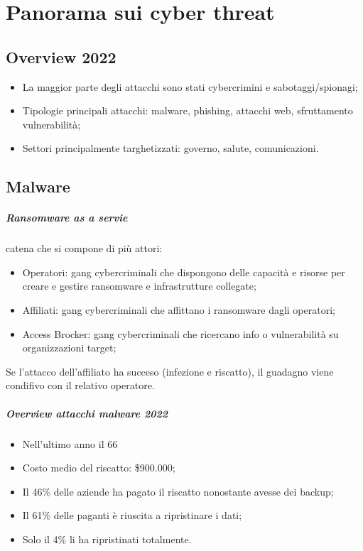 \chapter{Panorama sui cyber threat}

\section{Overview 2022}
\begin{itemize}
    \item La maggior parte degli attacchi sono stati cybercrimini e sabotaggi/spionagi;
    \item Tipologie principali attacchi: malware, phishing, attacchi web, sfruttamento vulnerabilità;
    \item Settori principalmente targhetizzati: governo, salute, comunicazioni.
\end{itemize}

\section{Malware}
\paragraph{Ransomware as a servie} catena che si compone di più attori:
\begin{itemize}
    \item Operatori: gang cybercriminali che dispongono delle capacità e risorse per creare e gestire ransomware e infrastrutture collegate;
    \item Affiliati: gang cybercriminali che affittano i ransomware dagli operatori;
    \item Access Brocker: gang cybercriminali che ricercano info o vulnerabilità su organizzazioni target;
\end{itemize}
Se l'attacco dell'affiliato ha succeso (infezione e riscatto), il guadagno viene condifivo con il relativo operatore.

\paragraph{Overview attacchi malware 2022}
\begin{itemize}
    \item Nell'ultimo anno il 66%
    \item Costo medio del riscatto: \$900.000;
    \item Il 46\% delle aziende ha pagato il riscatto nonostante avesse dei backup;
    \item Il 61\% delle paganti è riuscita a ripristinare i dati;
    \item Solo il 4\% li ha ripristinati totalmente.
\end{itemize}

